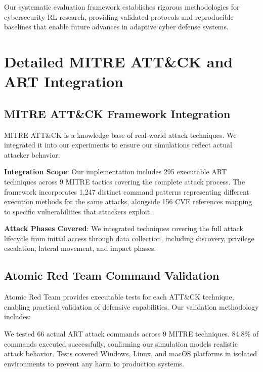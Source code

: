 \documentclass[12pt,oneside]{article}
\begin{document}
Our systematic evaluation framework establishes rigorous methodologies for cybersecurity RL research, providing validated protocols and reproducible baselines that enable future advances in adaptive cyber defense systems.






\appendix

\section{Detailed MITRE ATT\&CK and ART Integration}

\subsection{MITRE ATT\&CK Framework Integration}

MITRE ATT\&CK is a knowledge base of real-world attack techniques. We integrated it into our experiments to ensure our simulations reflect actual attacker behavior:

\textbf{Integration Scope}: Our implementation includes 295 executable ART techniques across 9 MITRE tactics covering the complete attack process. The framework incorporates 1,247 distinct command patterns representing different execution methods for the same attacks, alongside 156 CVE references mapping to specific vulnerabilities that attackers exploit \cite{atomic_red_team}.

\textbf{Attack Phases Covered}: We integrated techniques covering the full attack lifecycle from initial access through data collection, including discovery, privilege escalation, lateral movement, and impact phases.

\subsection{Atomic Red Team Command Validation}

Atomic Red Team provides executable tests for each ATT\&CK technique, enabling practical validation of defensive capabilities. Our validation methodology includes:

We tested 66 actual ART attack commands across 9 MITRE techniques. 84.8\% of commands executed successfully, confirming our simulation models realistic attack behavior. Tests covered Windows, Linux, and macOS platforms in isolated environments to prevent any harm to production systems.
\end{document}
